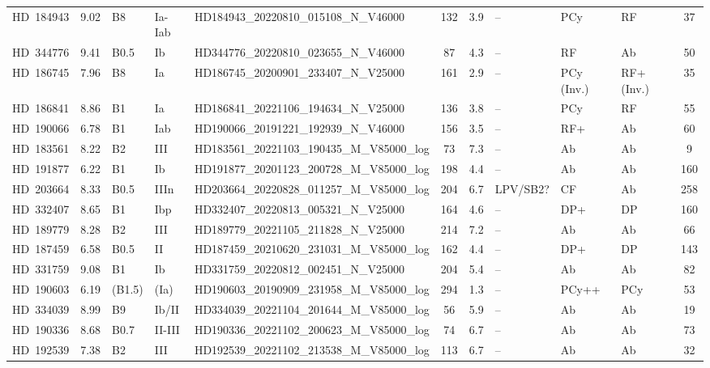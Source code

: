 {\begin{landscape}
\begin{longtable}{lclllcclllc}
\noalign{\smallskip}
HD~184943 & 9.02 & B8 & Ia-Iab & HD184943\_20220810\_015108\_N\_V46000 & 132 & 3.9 & -- & PCy & RF & 37 \\
\noalign{\smallskip}
HD~344776 & 9.41 & B0.5 & Ib & HD344776\_20220810\_023655\_N\_V46000 & 87 & 4.3 & -- & RF & Ab & 50 \\
\noalign{\smallskip}
HD~186745 & 7.96 & B8 & Ia & HD186745\_20200901\_233407\_N\_V25000 & 161 & 2.9 & -- & PCy\,(Inv.) & RF+\,(Inv.) & 35 \\
\noalign{\smallskip}
HD~186841 & 8.86 & B1 & Ia & HD186841\_20221106\_194634\_N\_V25000 & 136 & 3.8 & -- & PCy & RF & 55 \\
\noalign{\smallskip}
HD~190066 & 6.78 & B1 & Iab & HD190066\_20191221\_192939\_N\_V46000 & 156 & 3.5 & -- & RF+ & Ab & 60 \\
\noalign{\smallskip}
HD~183561 & 8.22 & B2 & III & HD183561\_20221103\_190435\_M\_V85000\_log & 73 & 7.3 & -- & Ab & Ab & 9 \\
\noalign{\smallskip}
HD~191877 & 6.22 & B1 & Ib & HD191877\_20201123\_200728\_M\_V85000\_log & 198 & 4.4 & -- & Ab & Ab & 160 \\
\noalign{\smallskip}
HD~203664 & 8.33 & B0.5 & IIIn & HD203664\_20220828\_011257\_M\_V85000\_log & 204 & 6.7 & LPV/SB2? & CF & Ab & 258 \\
\noalign{\smallskip}
HD~332407 & 8.65 & B1 & Ibp & HD332407\_20220813\_005321\_N\_V25000 & 164 & 4.6 & -- & DP+ & DP & 160 \\
\noalign{\smallskip}
HD~189779 & 8.28 & B2 & III & HD189779\_20221105\_211828\_N\_V25000 & 214 & 7.2 & -- & Ab & Ab & 66 \\
\noalign{\smallskip}
HD~187459 & 6.58 & B0.5 & II & HD187459\_20210620\_231031\_M\_V85000\_log & 162 & 4.4 & -- & DP+ & DP & 143 \\
\noalign{\smallskip}
HD~331759 & 9.08 & B1 & Ib & HD331759\_20220812\_002451\_N\_V25000 & 204 & 5.4 & -- & Ab & Ab & 82 \\
\noalign{\smallskip}
HD~190603 & 6.19 & (B1.5) & (Ia) & HD190603\_20190909\_231958\_M\_V85000\_log & 294 & 1.3 & -- & PCy++ & PCy & 53 \\
\noalign{\smallskip}
HD~334039 & 8.99 & B9 & Ib/II & HD334039\_20221104\_201644\_M\_V85000\_log & 56 & 5.9 & -- & Ab & Ab & 19 \\
\noalign{\smallskip}
HD~190336 & 8.68 & B0.7 & II-III & HD190336\_20221102\_200623\_M\_V85000\_log & 74 & 6.7 & -- & Ab & Ab & 73 \\
\noalign{\smallskip}
HD~192539 & 7.38 & B2 & III & HD192539\_20221102\_213538\_M\_V85000\_log & 113 & 6.7 & -- & Ab & Ab & 32 \\

\end{longtable}
\end{landscape}}

